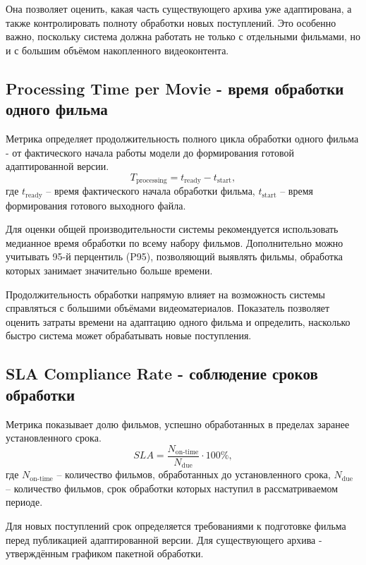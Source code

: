 \documentclass[a4paper,14pt]{extarticle}
\begin{document}
    Она позволяет оценить, какая часть существующего архива уже адаптирована, а также контролировать полноту обработки новых поступлений.
    Это особенно важно, поскольку система должна работать не только с отдельными фильмами, но и с большим объёмом накопленного видеоконтента.

    \subsection{Processing Time per Movie - время обработки одного фильма}
    Метрика определяет продолжительность полного цикла обработки одного фильма - от фактического начала работы модели до формирования готовой адаптированной версии.
    \begin{equation*}
        \displaystyle T_{\text{processing}} = t_{\text{ready}} - t_{\text{start}},
    \end{equation*}
    где $t_{\text{ready}}$ -- время фактического начала обработки фильма, $t_{\text{start}}$ -- время формирования готового выходного файла.

    Для оценки общей производительности системы рекомендуется использовать медианное время обработки по всему набору фильмов. 
    Дополнительно можно учитывать 95-й перцентиль (P95), позволяющий выявлять фильмы, обработка которых занимает значительно больше времени.

    Продолжительность обработки напрямую влияет на возможность системы справляться с большими объёмами видеоматериалов. 
    Показатель позволяет оценить затраты времени на адаптацию одного фильма и определить, насколько быстро система может обрабатывать новые поступления.

    \subsection{SLA Compliance Rate - соблюдение сроков обработки}
    Метрика показывает долю фильмов, успешно обработанных в пределах заранее установленного срока.
    \begin{equation*}
        \displaystyle SLA = \frac{N_{\text{on-time}}}{N_{\text{due}}} \cdot 100 \%,
    \end{equation*}
    где $N_{\text{on-time}}$ -- количество фильмов, обработанных до установленного срока, $N_{\text{due}}$ -- количество фильмов, срок обработки которых наступил в рассматриваемом периоде.

    Для новых поступлений срок определяется требованиями к подготовке фильма перед публикацией адаптированной версии.
    Для существующего архива - утверждённым графиком пакетной обработки.
\end{document}
